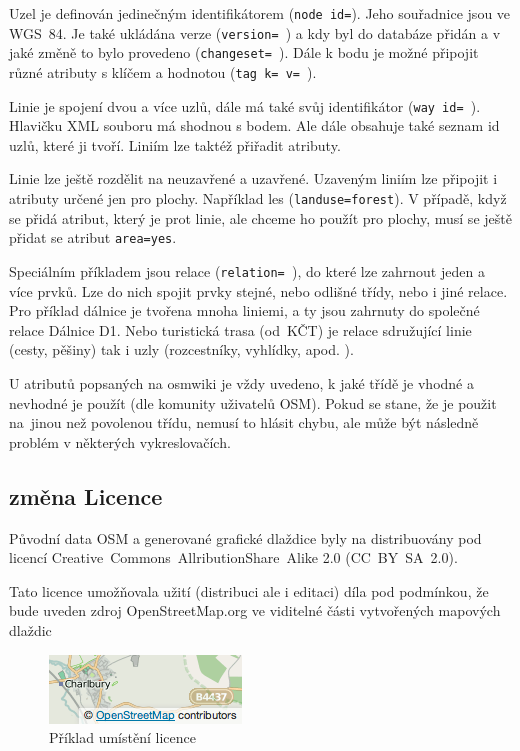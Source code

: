 Uzel je definován jedinečným identifikátorem ({\tt node id=}). Jeho
souřadnice jsou ve WGS~84. Je také ukládána verze ({\tt version= }) a kdy
byl do databáze přidán a v jaké změně to bylo provedeno ({\tt changeset=~}).
Dále k bodu je možné připojit různé atributy s klíčem a hodnotou ({\tt tag~k=~v=~}).

Linie je spojení dvou a více uzlů, dále má také svůj identifikátor ({\tt way~id=~}).
Hlavičku XML souboru má shodnou s bodem. Ale dále obsahuje také seznam id uzlů,
které ji tvoří. Liniím lze taktéž přiřadit atributy.

Linie lze ještě rozdělit na neuzavřené a uzavřené. Uzaveným liniím lze připojit
i atributy určené jen pro plochy. Například les ({\tt landuse=forest}).
V případě, když se přidá atribut, který je prot linie, ale chceme
ho použít pro plochy, musí se ještě přidat se atribut {\tt area=yes}.

Speciálním příkladem jsou relace ({\tt relation= }), do které lze zahrnout
jeden a více prvků. Lze do nich spojit prvky stejné, nebo odlišné třídy,
nebo i jiné relace. Pro příklad dálnice je tvořena mnoha liniemi, a ty
jsou zahrnuty do společné relace Dálnice D1. Nebo turistická trasa
(od~KČT) je relace sdružující linie (cesty, pěšiny) tak i uzly
(rozcestníky, vyhlídky, apod. ).

U atributů popsaných na osmwiki je vždy uvedeno, k jaké třídě je
vhodné a nevhodné je použít (dle komunity uživatelů OSM). Pokud se stane, že je použit
na~jinou než povolenou třídu, nemusí to hlásit chybu, ale může být následně
problém v některých vykreslovačích. \cite{OSMfeatures}

\subsection{změna Licence}
\label{změna licence}

Původní data OSM a generované grafické dlaždice
byly na distribuovány pod licencí
Creative~Commons~AllributionShare~Alike 2.0 (CC~BY~SA~2.0).

Tato licence umožňovala užití (distribuci ale i editaci) díla pod podmínkou,
že bude uveden zdroj OpenStreetMap.org ve viditelné části
vytvořených mapových dlaždic \cite{OSMlicence}

  \begin{figure}[hbt]
    \centering
      \includegraphics{./pictures/attribution_example.png}
      \caption{Příklad umístění licence}
      \label{fig:attribution_example}
  \end{figure} 

